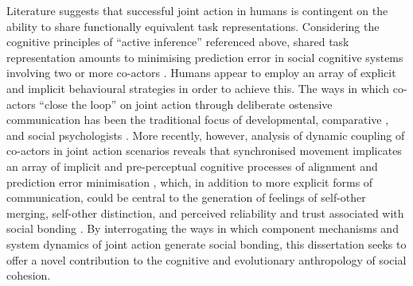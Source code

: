 Literature suggests that successful joint action in humans is contingent on the ability to share functionally equivalent task representations. Considering the cognitive principles of ``active inference'' referenced above, shared task representation amounts to minimising prediction error in social cognitive systems involving two or more co-actors \citep{Semin2008,Frith2010}.  Humans appear to employ an array of explicit and implicit behavioural strategies in order to achieve this.   The ways in which co-actors ``close the loop'' \citep{Frith2007} on joint action through deliberate ostensive communication has been the traditional focus of developmental, comparative \cite{Tomasello2005a}, and social psychologists \citep{Sebanz2006}.
More recently, however, analysis of dynamic coupling of co-actors in joint action scenarios reveals that synchronised movement implicates an array of implicit and pre-perceptual cognitive processes of alignment and prediction error minimisation \citep{Schmidt2011}, which, in addition to more explicit forms of communication, could be central to the generation of feelings of self-other merging, self-other distinction, and perceived reliability and trust associated with social bonding \citep{Marsh2009}. By interrogating the ways in which component mechanisms and system dynamics of joint action generate social bonding, this dissertation seeks to offer a novel contribution to the cognitive and evolutionary anthropology of social cohesion.








